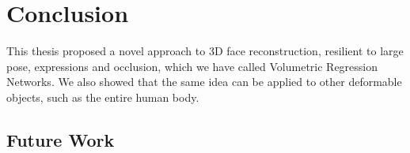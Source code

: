 \chapter{Conclusion}
\label{chapter:conclusion}

This thesis proposed a novel approach to 3D face reconstruction,
resilient to large pose, expressions and occlusion, which we have
called Volumetric Regression Networks. We also showed that the same
idea can be applied to other deformable objects, such as the entire
human body.

\section{Future Work}






